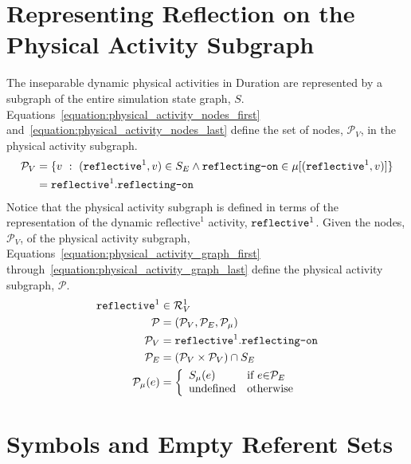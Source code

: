 \section{Representing Reflection on the Physical Activity Subgraph}

The inseparable dynamic physical activities in Duration are
represented by a subgraph of the entire simulation state graph, $S$.
{\mbox{Equations~\ref{equation:physical_activity_nodes_first}}}
{\mbox{and~\ref{equation:physical_activity_nodes_last}}} define the
set of nodes, $\mathcal{P}_V$, in the physical activity subgraph.
\begin{align}
\label{equation:physical_activity_nodes_first}
  \mathcal{P}_V &= \{v ~:~ (\text{\tt{reflective}}^1, v) \in S_E \wedge \text{\tt{reflecting-on}} \in \mu[(\text{\tt{reflective}}^1, v)]\} \\
\label{equation:physical_activity_nodes_last}
                &= \text{\tt{reflective}}^1.\text{\tt{reflecting-on}}
\end{align}
Notice that the physical activity subgraph is defined in terms of the
representation of the dynamic $\text{reflective}^1$ activity,
$\text{\tt{reflective}}^1$.  Given the nodes, $\mathcal{P}_V$, of the
physical activity subgraph,
{\mbox{Equations~\ref{equation:physical_activity_graph_first}}}
{\mbox{through~\ref{equation:physical_activity_graph_last}}} define
the physical activity subgraph, $\mathcal{P}$.
\begin{align}
\label{equation:physical_activity_graph_first}
           \text{\tt{reflective}}^1 &\in \mathcal{R}^1_V \\
                        \mathcal{P} &= (\mathcal{P}_V, \mathcal{P}_E, \mathcal{P}_\mu) \\
                      \mathcal{P}_V &= \text{\tt{reflective}}^1.\text{\tt{reflecting-on}} \\
                      \mathcal{P}_E &= (\mathcal{P}_V \times \mathcal{P}_V) \cap S_E \\
\label{equation:physical_activity_graph_last}
\mathcal{P}_\mu(e) &=
   {\left\{
      \begin{array}{ll}
        S_\mu(e) & \text{if }e {\in} \mathcal{P}_E \\
        \text{undefined}          & \text{otherwise}
      \end{array}
    \right.}
\end{align}

\section{Symbols and Empty Referent Sets}

